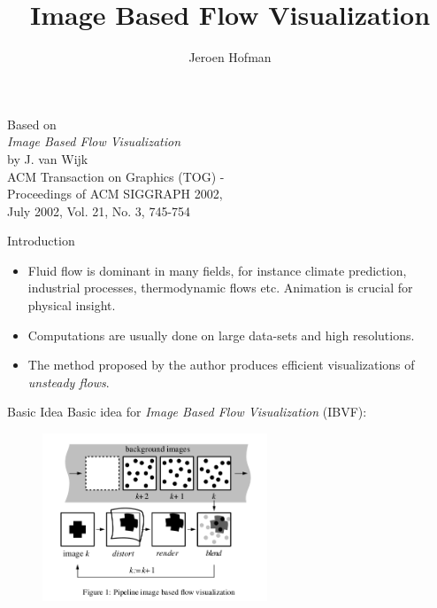 \documentclass[red]{beamer}
\title
{Image Based Flow Visualization \\
}
\author
{Jeroen Hofman}
\institute
{
 Department of Computational Science\\
 University of Amsterdam}
\begin{document}
\graphicspath{{/home/jhofman/Desktop/CSS/Figures/}}


\begin{frame}
  \titlepage
\end{frame}

\begin{frame}
  \begin{center}
    Based on \\
    \emph{Image Based Flow Visualization} \\
    by J. van Wijk \\
    \vspace{10pt}
    \small{ACM Transaction on Graphics (TOG) -\\ Proceedings of ACM SIGGRAPH 2002,\\ July 2002, Vol. 21, No. 3, 745-754}
  \end{center}
\end{frame}

\begin{frame}{Introduction}
  \begin{itemize}
  \item 
    Fluid flow is dominant in many fields, for instance climate prediction, industrial processes, thermodynamic flows etc. Animation is crucial for physical insight.
  \item
    Computations are usually done on large data-sets and high resolutions.
  \item
    The method proposed by the author produces efficient visualizations of \emph{unsteady flows}.
  \end{itemize}
\end{frame}


\begin{frame}{Basic Idea}
  Basic idea for \emph{Image Based Flow Visualization} (IBVF):
  \begin{figure}[H]
    \centering
    \includegraphics[width=0.6\textwidth]{pipeline.png}
  \end{figure}
\end{frame}
\end{document}
